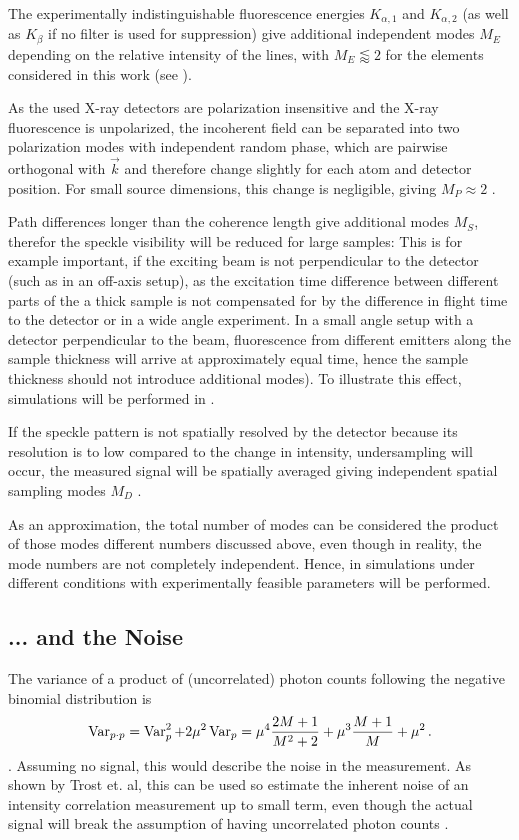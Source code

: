 The experimentally indistinguishable fluorescence energies $K_{\alpha,1}$ and $K_{\alpha,2}$ (as well as  $K_\beta$ if no filter is used for suppression) give additional independent modes $M_E$ depending on the relative intensity of the lines, with $M_E \lessapprox 2$ for the elements considered in this work (see ).

As the used X-ray detectors are polarization insensitive and the X-ray fluorescence is unpolarized, the incoherent field can be separated into two polarization modes with independent random phase, which are pairwise orthogonal with $\vec{k}$ and therefore change slightly for each atom and detector position. For small source dimensions, this change is negligible,  giving $M_P \approx 2$ \cite{classen2019}. 


Path differences longer than the coherence length give additional modes $M_S$, therefor the speckle visibility will be reduced for large samples:
This is for example important, if the exciting beam is not perpendicular to the detector (such as in an off-axis setup), as the excitation time difference between different parts of the a thick sample is not compensated for by the difference in flight time to the detector or in a wide angle experiment. In a small angle setup with a detector perpendicular to the beam, fluorescence from different emitters along the sample thickness will arrive at approximately equal time, hence the sample thickness should not introduce additional modes). To illustrate this effect, simulations will be performed in .

If the speckle pattern is not spatially resolved by the detector because its resolution is to low compared to the change in intensity, undersampling will occur, the measured signal will be spatially averaged giving independent spatial sampling modes $M_D$ \cite{goodman2007}.

As an approximation, the total number of modes can be considered the product of those modes different numbers discussed above, even though in reality, the mode numbers are not completely independent.
Hence, in   simulations under different conditions with experimentally feasible  parameters will be performed.


\subsection{... and the Noise}
The variance of a product of (uncorrelated) photon counts following the negative binomial distribution  is
\begin{equation}
	\operatorname{Var}_{p\cdot p}= \operatorname{Var}_p^2 +2 \mu^2\operatorname{Var}_p	= \mu^4 \frac{2 M + 1}{M^2 + 2}+ \mu^3 \frac{M+1}{M} + \mu^2 \,.
\end{equation}.
Assuming no signal, this would describe the noise in the measurement.
As shown by Trost et. al, this can be used so estimate the inherent noise of an intensity correlation measurement up to small term, even though the actual signal will break the assumption of having uncorrelated photon counts \cite{trost2020}.

